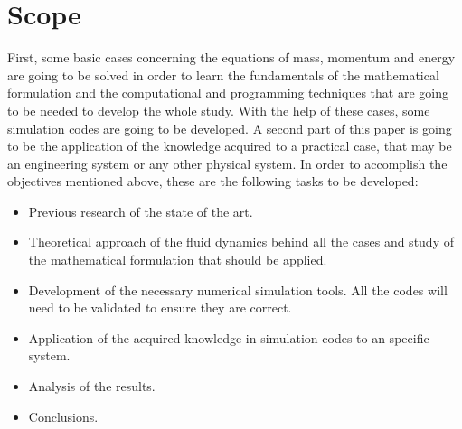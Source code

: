 

\section{Scope}
First, some basic cases concerning the equations of mass, momentum and energy are going to be solved in order to learn the fundamentals of the mathematical formulation and the computational and programming techniques that are going to be needed to develop the whole study. With the help of these cases, some simulation codes are going to be developed.
\newline
A second part of this paper is going to be the application of the knowledge acquired to a practical case, that may be an engineering system or any other physical system.
\newline
\newline
In order to accomplish the objectives mentioned above, these are the following tasks to be developed:
\begin{itemize}
	\item Previous research of the state of the art.
	\item Theoretical approach of the fluid dynamics behind all the cases and study of the mathematical formulation that should be applied.
	\item Development of the necessary numerical simulation tools. All the codes will need to be validated to ensure they are correct.
	\item Application of the acquired knowledge in simulation codes to an specific system.
	\item Analysis of the results.
	\item Conclusions.
\end{itemize}

